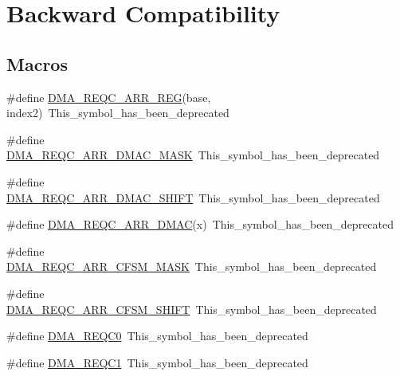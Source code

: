\hypertarget{group___backward___compatibility___symbols}{}\section{Backward Compatibility}
\label{group___backward___compatibility___symbols}
\subsection*{Macros}
\begin{DoxyCompactItemize}
\item 
\#define \hyperlink{group___backward___compatibility___symbols_gaaf86e5770af62c08d70a8808bfab9d92}{D\+M\+A\+\_\+\+R\+E\+Q\+C\+\_\+\+A\+R\+R\+\_\+\+R\+EG}(base,  index2)~This\+\_\+symbol\+\_\+has\+\_\+been\+\_\+deprecated
\item 
\#define \hyperlink{group___backward___compatibility___symbols_ga8e9317db9c352716b95281ed740c533e}{D\+M\+A\+\_\+\+R\+E\+Q\+C\+\_\+\+A\+R\+R\+\_\+\+D\+M\+A\+C\+\_\+\+M\+A\+SK}~This\+\_\+symbol\+\_\+has\+\_\+been\+\_\+deprecated
\item 
\#define \hyperlink{group___backward___compatibility___symbols_gabcd06f16caa331a970dac85d4d707107}{D\+M\+A\+\_\+\+R\+E\+Q\+C\+\_\+\+A\+R\+R\+\_\+\+D\+M\+A\+C\+\_\+\+S\+H\+I\+FT}~This\+\_\+symbol\+\_\+has\+\_\+been\+\_\+deprecated
\item 
\#define \hyperlink{group___backward___compatibility___symbols_ga084dca5e32360d1b1c4568f5e0d75c0f}{D\+M\+A\+\_\+\+R\+E\+Q\+C\+\_\+\+A\+R\+R\+\_\+\+D\+M\+AC}(x)~This\+\_\+symbol\+\_\+has\+\_\+been\+\_\+deprecated
\item 
\#define \hyperlink{group___backward___compatibility___symbols_gaa28ab53f19cb06ff7ab8a03dfc646355}{D\+M\+A\+\_\+\+R\+E\+Q\+C\+\_\+\+A\+R\+R\+\_\+\+C\+F\+S\+M\+\_\+\+M\+A\+SK}~This\+\_\+symbol\+\_\+has\+\_\+been\+\_\+deprecated
\item 
\#define \hyperlink{group___backward___compatibility___symbols_ga7130ea81cb843080f9c2ec4e537cd81c}{D\+M\+A\+\_\+\+R\+E\+Q\+C\+\_\+\+A\+R\+R\+\_\+\+C\+F\+S\+M\+\_\+\+S\+H\+I\+FT}~This\+\_\+symbol\+\_\+has\+\_\+been\+\_\+deprecated
\item 
\#define \hyperlink{group___backward___compatibility___symbols_ga734643acca0a28e7a07dc8c705fbc1f8}{D\+M\+A\+\_\+\+R\+E\+Q\+C0}~This\+\_\+symbol\+\_\+has\+\_\+been\+\_\+deprecated
\item 
\#define \hyperlink{group___backward___compatibility___symbols_gadfccb3dbbd2bc4fc89afd35a2743d074}{D\+M\+A\+\_\+\+R\+E\+Q\+C1}~This\+\_\+symbol\+\_\+has\+\_\+been\+\_\+deprecated

\end{DoxyCompactItemize}
